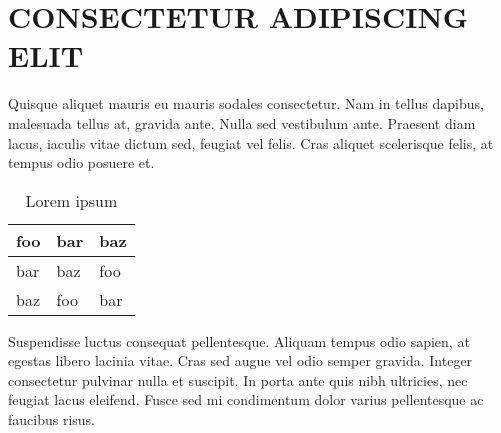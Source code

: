 \documentclass[letterpaper]{../kuthesis/kuthesis}
\begin{document}
\chapter{CONSECTETUR ADIPISCING ELIT}
\setcounter{figure}{0} %
\setcounter{table}{0}
Quisque aliquet mauris eu mauris sodales consectetur. Nam in tellus dapibus, malesuada tellus at, gravida ante. Nulla sed vestibulum ante. Praesent diam lacus, iaculis vitae dictum sed, feugiat vel felis. Cras aliquet scelerisque felis, at tempus odio posuere et. 
\begin{table}[h]
\centering
\caption{Lorem ipsum}
\begin{tabular}{|l|l|l|}
\hline
foo & bar & baz \\ \hline
bar & baz & foo \\ \hline
baz & foo & bar \\ \hline
\end{tabular}
\label{table:b1}
\end{table}
Suspendisse luctus consequat pellentesque. Aliquam tempus odio sapien, at egestas libero lacinia vitae. Cras sed augue vel odio semper gravida. Integer consectetur pulvinar nulla et suscipit. In porta ante quis nibh ultricies, nec feugiat lacus eleifend. Fusce sed mi condimentum dolor varius pellentesque ac faucibus risus.

\end{document}

